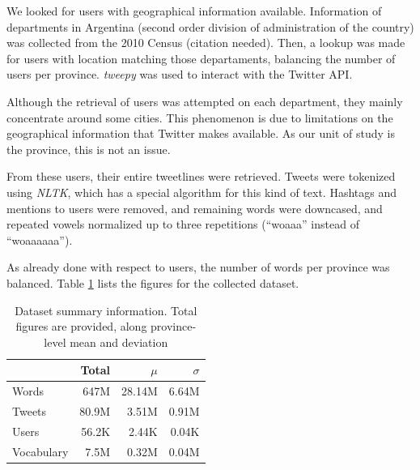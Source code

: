 We looked for users with geographical information available. Information of departments in Argentina (second order division of administration of the country) was collected from the 2010 Census (citation needed). Then, a lookup was made for users with location matching those departaments, balancing the number of users per province.  \textit{tweepy} was used to interact with the Twitter API. 

Although the retrieval of users was attempted on each department, they mainly concentrate around some cities. This phenomenon is due to limitations on the geographical information that Twitter makes available. As our unit of study is the province, this is not an issue.

From these users, their entire tweetlines were retrieved. Tweets were tokenized using \emph{NLTK}\cite{bird2009natural}, which has a special algorithm for this kind of text. Hashtags and mentions to users were removed, and remaining words were downcased, and repeated vowels normalized up to three repetitions (``woaaa'' instead of ``woaaaaaa''). 

As already done with respect to users, the number of words per province was balanced. Table \ref{tab:summary_tweets} lists the figures for the collected dataset.

\begin{table}[b]
\begin{center}

\begin{tabular}{lrrr}
            & Total   & $\mu$   & $\sigma$ \\ %
\hline 
Words       &  647M   &  28.14M & 6.64M  \\ %
Tweets      &  80.9M  &  3.51M  & 0.91M  \\ %
Users       &  56.2K  &  2.44K  & 0.04K  \\ %
Vocabulary  &   7.5M  &  0.32M  & 0.04M  \\ %

\end{tabular}


\caption{Dataset summary information. Total figures are provided, along province-level mean and deviation }
\label{tab:summary_tweets}
\end{center}
\end{table}





